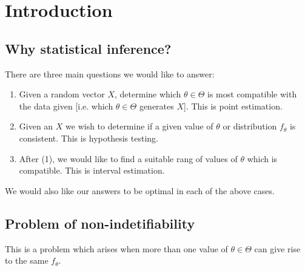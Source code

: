 \documentclass[oneside]{book}
\begin{document}
\begin{titlepage}
    
\end{titlepage}
\clearpage

\setmainfont{Indie Flower}

\tableofcontents

\chapter{Introduction}
\section{Why statistical inference?}
There are three main questions we would like to answer:
\begin{enumerate}
    \item Given a random vector $X$, determine which $\theta\in \Theta$ is most compatible with the data given [i.e. which $\theta\in\Theta$ generates $X$]. This is point estimation.
    \item Given an $X$ we wish to determine if a given value of $\theta$ or distribution $f_\theta$ is consistent. This is hypothesis testing.
    \item After (1), we would like to find a suitable rang of values of $\theta$ which is compatible. This is interval estimation.
\end{enumerate}
We would also like our answers to be optimal in each of the above cases. 

\section{Problem of non-indetifiability}
This is a problem which arises when more than one value of $\theta\in\Theta$ can give rise to the same $f_\theta$. 
\end{document}

